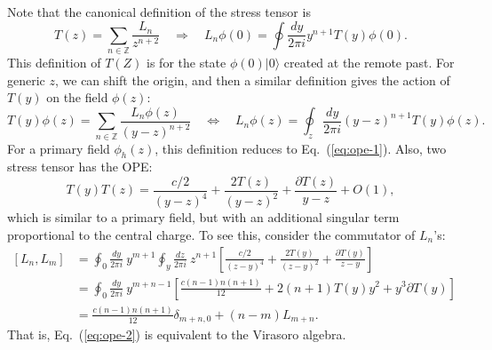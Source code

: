 \documentclass[aps,prb,superscriptaddress,nofootinbib]{revtex4}
\begin{document}
Note that the canonical definition of the stress tensor is
\begin{equation}
	T(z) = \sum_{n\in \mathbb Z}\frac{L_n}{z^{n+2}}
	\quad\Longrightarrow\quad
	L_n\phi(0) = \oint \frac{dy}{2\pi i} y^{n+1}T(y)\phi(0).
\end{equation}
This definition of $T(Z)$ is for the state $\phi(0)|0\rangle$ created at the remote past.
For generic $z$, we can shift the origin, and then a similar definition gives the action of $T(y)$ on the field $\phi(z)$:
\begin{equation}
	T(y) \phi(z) = \sum_{n \in \mathbb{Z}} \frac{L_n \phi(z)}{(y-z)^{n+2}} \quad \Longleftrightarrow\quad
	L_n \phi(z) = \oint_z \frac{dy}{2 \pi i} (y-z)^{n+1} T(y) \phi(z).
\end{equation}
For a primary field $\phi_h(z)$, this definition reduces to Eq.~(\ref{eq:ope-1}).
Also, two stress tensor has the OPE:
\begin{equation}\label{eq:ope-2}
	T(y) T(z) = \frac{c/2}{(y-z)^4} + \frac{2T(z)}{(y-z)^2} + \frac{\partial T(z)}{y-z} + O(1),
\end{equation}
which is similar to a primary field, but with an additional singular term proportional to the central charge.
To see this, consider the commutator of $L_n$'s:
\begin{equation}
\begin{aligned}
	\left[L_n, L_m\right]
	&= \oint_0 \frac{dy}{2\pi i}\ y^{m+1}\oint_y \frac{dz}{2\pi i}\ z^{n+1} \left[\frac{c/2}{(z-y)^4} + \frac{2T(y)}{(z-y)^2} + \frac{\partial T(y)}{z-y}\right] \\
	&= \oint_0 \frac{dy}{2\pi i}\ y^{m+n-1}\left[\frac{c (n-1)n(n+1)}{12} + 2(n+1)T(y)y^2 + y^3 \partial T(y) \right] \\
	&= \frac{c(n-1)n(n+1)}{12} \delta_{m+n,0} + (n-m) L_{m+n}.
\end{aligned}
\end{equation}
That is, Eq.~(\ref{eq:ope-2}) is equivalent to the Virasoro algebra.
\end{document}
